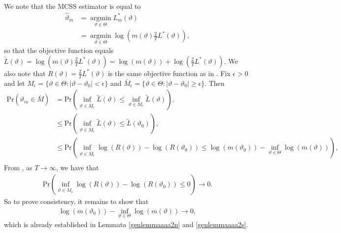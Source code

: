 {{We note that the MCSS estimator is equal to 
\begin{align*}
    \hat{\vartheta}_{m} &= \operatorname*{argmin}_{\vartheta \in \Theta}  L^*_{m}(\vartheta) \\
                   &= \operatorname*{argmin}_{\vartheta \in \Theta}  \log \left(m(\vartheta)\frac{2}{T}L^*(\vartheta)\right),
\end{align*}
so that the objective function equals $\tilde{L}(\vartheta) = \log \left(m(\vartheta)\frac{2}{T}L^*(\vartheta)\right) = \log(m(\vartheta)) + \log\left(\frac{2}{T}L^*(\vartheta)\right)$. We also note that $R(\vartheta) = \frac{2}{T}L^*(\vartheta) $ is the same objective function as in \textcite{hualde2020truncated}. 
Fix $\epsilon > 0$ and let $M_{\epsilon} = \{\vartheta \in \Theta: |\vartheta-\vartheta_0| < \epsilon \}$
and $\bar{M}_{\epsilon} = \{\vartheta \in \Theta: |\vartheta-\vartheta_0| \geq \epsilon \}$. Then 
\begin{align*}
    \text{Pr}\left(\hat{\vartheta}_{m} \in \bar{M} \right) &= \text{Pr}\left(\inf_{\vartheta \in \bar{M}_{\epsilon}}\tilde{L}(\vartheta) \leq \inf_{\vartheta \in M_{\epsilon}} \tilde{L}(\vartheta) \right), \\ 
    &\leq \text{Pr}\left(\inf_{\vartheta \in \bar{M}_{\epsilon}}\tilde{L}(\vartheta) \leq  \tilde{L}(\vartheta_0) \right), \\
    &\leq \text{Pr}\left(\inf_{\vartheta \in \bar{M}_{\epsilon}} \log(R(\vartheta))-\log(R(\vartheta_0)) \leq  \log(m(\vartheta_0))- \inf_{\vartheta \in \Theta} \log(m(\vartheta)) \right), \\
\end{align*}
From \textcite{hualde2020truncated}, as $T \rightarrow \infty$, we have that  
\begin{align*}
    \text{Pr}\left(\inf_{\vartheta \in \bar{M}_{\epsilon}} \log(R(\vartheta))-\log(R(\vartheta_0)) \leq 0 \right) \rightarrow 0.
\end{align*}
So to prove consistency, it remains to show that  
\begin{align}
    \log(m(\vartheta_0))- \inf_{\vartheta \in \Theta} \log(m(\vartheta)) \rightarrow 0, \label{consistency}
\end{align}
which is already established in Lemmata \ref{genlemmaaaa2n} and \ref{genlemmaaaa2s}.



}}
